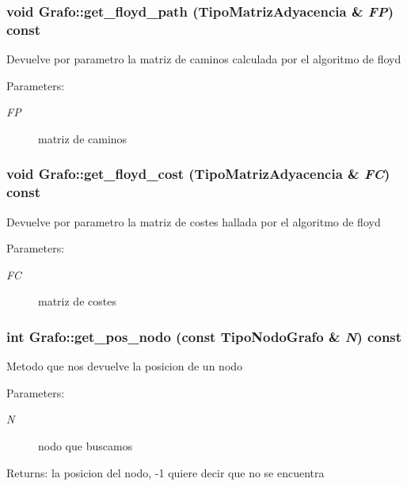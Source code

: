 \subsubsection{\setlength{\rightskip}{0pt plus 5cm}void Grafo::get\_\-floyd\_\-path ({\bf TipoMatrizAdyacencia} \& {\em FP}) const}\label{classGrafo_ea3df48d2408f0a4b4e60876e5220ff6}


Devuelve por parametro la matriz de caminos calculada por el algoritmo de floyd \begin{Desc}
\item[Parameters:]
\begin{description}
\item[{\em FP}]matriz de caminos \end{description}
\end{Desc}
\subsubsection{\setlength{\rightskip}{0pt plus 5cm}void Grafo::get\_\-floyd\_\-cost ({\bf TipoMatrizAdyacencia} \& {\em FC}) const}\label{classGrafo_012df6698661eb60303cf0bdb3977044}


Devuelve por parametro la matriz de costes hallada por el algoritmo de floyd \begin{Desc}
\item[Parameters:]
\begin{description}
\item[{\em FC}]matriz de costes \end{description}
\end{Desc}
\subsubsection{\setlength{\rightskip}{0pt plus 5cm}int Grafo::get\_\-pos\_\-nodo (const {\bf TipoNodoGrafo} \& {\em N}) const}\label{classGrafo_36fbfae4091a6d8ba809f93c7f29cb74}


Metodo que nos devuelve la posicion de un nodo \begin{Desc}
\item[Parameters:]
\begin{description}
\item[{\em N}]nodo que buscamos \end{description}
\end{Desc}
\begin{Desc}
\item[Returns:]la posicion del nodo, -1 quiere decir que no se encuentra \end{Desc}
